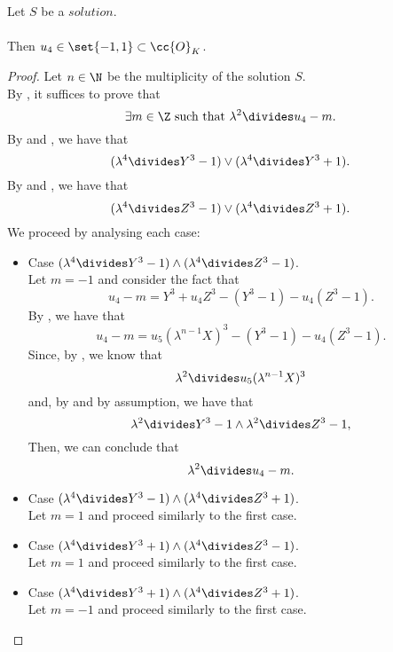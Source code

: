 \begin{lemma}
  \label{lmm:by_kummer}
  \leanok
  Let $S$ be a $solution$.\\\\
  Then $u_4 \in \set{-1,1} \subset \cc{O}_K$.
\end{lemma}
\begin{proof}
  \leanok
  Let $n \in \N$ be the multiplicity of the solution $S$.\\
  By , it suffices to prove that
  $$\exists m \in \Z \text{ such that } \lambda^2 \divides u_4 - m.$$
  By 
  and , we have that
  $$(\lambda^4 \divides Y^3 - 1) \lor (\lambda^4 \divides Y^3 + 1).$$
  By 
  and , we have that
  $$(\lambda^4 \divides Z^3 - 1) \lor (\lambda^4 \divides Z^3 + 1).$$
  We proceed by analysing each case:
  \begin{itemize}
      \item Case $(\lambda^4 \divides Y^3 - 1) \land (\lambda^4 \divides Z^3 - 1)$. \\
            Let $m=-1$ and consider the fact that
            $$u_4 - m = Y^3 + u_4 Z^3 - (Y^3 - 1) - u_4 (Z^3 - 1).$$
            By , we have that
            $$u_4 - m = u_5 (\lambda^{n-1} X)^3 - (Y^3 - 1) - u_4 (Z^3 - 1).$$
            Since, by , we know that
            $$\lambda^2 \divides u_5 (\lambda^{n-1} X)^3$$
            and, by  and by assumption, we have that
            $$\lambda^2 \divides Y^3 - 1 \land \lambda^2 \divides Z^3 - 1,$$
            Then, we can conclude that
            $$\lambda^2 \divides u_4 - m.$$
      \item Case $(\lambda^4 \divides Y^3 - 1) \land (\lambda^4 \divides Z^3 + 1)$. \\
            Let $m=1$ and proceed similarly to the first case.
      \item Case $(\lambda^4 \divides Y^3 + 1) \land (\lambda^4 \divides Z^3 - 1)$. \\
            Let $m=1$ and proceed similarly to the first case.
      \item Case $(\lambda^4 \divides Y^3 + 1) \land (\lambda^4 \divides Z^3 + 1)$. \\
            Let $m=-1$ and proceed similarly to the first case.
  \end{itemize}
\end{proof}

